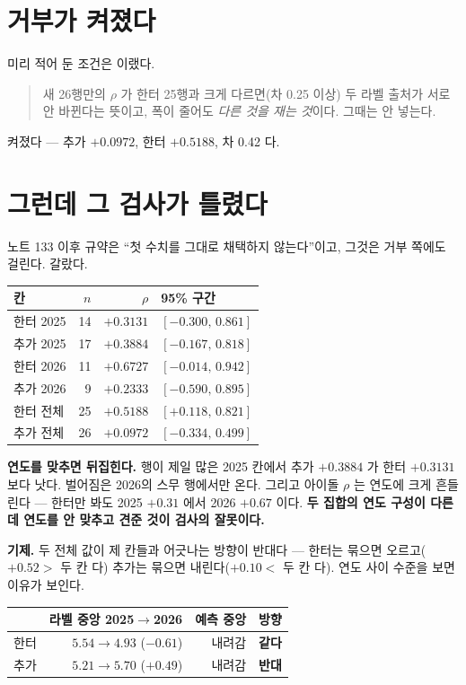 \documentclass[11pt]{article}
\begin{document}
\section{거부가 켜졌다}

미리 적어 둔 조건은 이랬다.

\begin{quote}
새 26행만의 $\rho$ 가 한터 25행과 크게 다르면(차 0.25 이상) 두 라벨
출처가 서로 안 바뀐다는 뜻이고, 폭이 줄어도 \emph{다른 것을 재는 것}이다.
그때는 안 넣는다.
\end{quote}

켜졌다 --- 추가 $+0.0972$, 한터 $+0.5188$, 차 0.42 다.

\section{그런데 그 검사가 틀렸다}

노트 133 이후 규약은 ``첫 수치를 그대로 채택하지 않는다''이고, 그것은
거부 쪽에도 걸린다. 갈랐다.

\begin{center}
\begin{tabular}{lrrl}
\hline
칸 & $n$ & $\rho$ & 95\% 구간 \\
\hline
한터 2025 & 14 & $+0.3131$ & $[-0.300,\,0.861]$ \\
추가 2025 & 17 & $+0.3884$ & $[-0.167,\,0.818]$ \\
한터 2026 & 11 & $+0.6727$ & $[-0.014,\,0.942]$ \\
추가 2026 &  9 & $+0.2333$ & $[-0.590,\,0.895]$ \\
\hline
한터 전체 & 25 & $+0.5188$ & $[+0.118,\,0.821]$ \\
추가 전체 & 26 & $+0.0972$ & $[-0.334,\,0.499]$ \\
\hline
\end{tabular}
\end{center}

\textbf{연도를 맞추면 뒤집힌다.} 행이 제일 많은 2025 칸에서 추가
$+0.3884$ 가 한터 $+0.3131$ 보다 낫다. 벌어짐은 2026의 스무 행에서만
온다. 그리고 아이돌 $\rho$ 는 연도에 크게 흔들린다 --- 한터만 봐도
2025 $+0.31$ 에서 2026 $+0.67$ 이다. \textbf{두 집합의 연도 구성이
다른데 연도를 안 맞추고 견준 것이 검사의 잘못이다.}

\textbf{기제.} 두 전체 값이 제 칸들과 어긋나는 방향이 반대다 --- 한터는
묶으면 오르고($+0.52 >$ 두 칸 다) 추가는 묶으면 내린다($+0.10 <$ 두 칸 다).
연도 사이 수준을 보면 이유가 보인다.

\begin{center}
\begin{tabular}{lrrr}
\hline
 & 라벨 중앙 2025$\to$2026 & 예측 중앙 & 방향 \\
\hline
한터 & $5.54 \to 4.93$ ($-0.61$) & 내려감 & \textbf{같다} \\
추가 & $5.21 \to 5.70$ ($+0.49$) & 내려감 & \textbf{반대} \\
\hline
\end{tabular}
\end{center}
\end{document}

